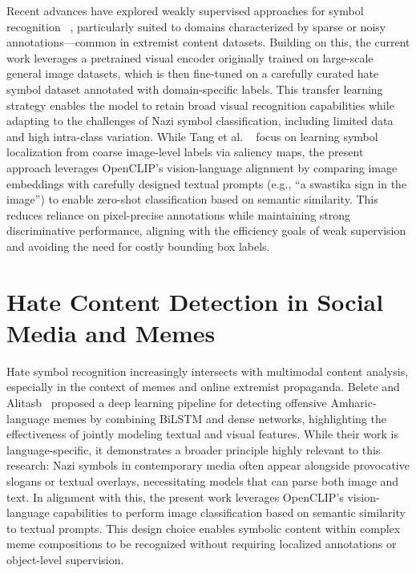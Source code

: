 Recent advances have explored weakly supervised approaches for symbol recognition
~\parencite{tang2017multipleinstancedetectionnetwork}, particularly suited to domains characterized by sparse or
noisy annotations—common in extremist content datasets. Building on this, the current work leverages a pretrained
visual encoder originally trained on large-scale general image datasets, which is then fine-tuned on a carefully
curated hate symbol dataset annotated with domain-specific labels. This transfer learning strategy enables the model
to retain broad visual recognition capabilities while adapting to the challenges of Nazi symbol classification,
including limited data and high intra-class variation. While Tang et al.
~\parencite{tang2017multipleinstancedetectionnetwork} focus on learning symbol localization from coarse image-level
labels via saliency maps,  the present approach leverages OpenCLIP’s vision-language alignment by comparing image
embeddings with carefully designed textual prompts (e.g., “a swastika sign in the image”) to enable zero-shot
classification based on semantic similarity. This reduces reliance on pixel-precise annotations
while maintaining strong discriminative performance, aligning with the efficiency goals of weak supervision and
avoiding the need for costly bounding box labels.

\section{Hate Content Detection in Social Media and Memes}

Hate symbol recognition increasingly intersects with multimodal content analysis, especially in the context of memes
and online extremist propaganda. Belete and Alitasb~\parencite{belete2025200258} proposed a deep learning pipeline
for detecting offensive Amharic-language memes by combining \ac{BiLSTM} and dense networks, highlighting the
effectiveness of jointly modeling textual and visual features. While their work is language-specific, it
demonstrates a broader principle highly relevant to this research: Nazi symbols in contemporary media often appear
alongside provocative slogans or textual overlays, necessitating models that can parse both image and text. In
alignment with this, the present work leverages OpenCLIP’s vision-language capabilities to perform image
classification based on semantic similarity to textual prompts. This design choice enables symbolic content within
complex meme compositions to be recognized without requiring localized annotations or object-level supervision.


